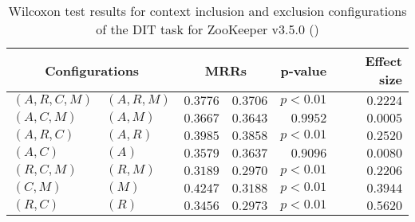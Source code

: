 
\begin{table}
\begin{spacing}{1.2}
\centering
\caption{Wilcoxon test results for context inclusion and exclusion configurations of the DIT task for ZooKeeper v3.5.0 (\ctwo)}
\label{table:versus-wilcox-zookeeper-dit-context}
\begin{tabular}{ll|rr|rr}
\toprule
      \multicolumn{2}{c|}{Configurations} &                \multicolumn{2}{c|}{MRRs} &             p-value & Effect size \\
\midrule
 $(A,R,C,M)$ &  $(A,R,M)$ &  $\bm{0.3776}$ &       $0.3706$ & $p<0.01$ &    $0.2224$ \\
   $(A,C,M)$ &    $(A,M)$ &  $\bm{0.3667}$ &       $0.3643$ & $0.9952$ &    $0.0005$ \\
   $(A,R,C)$ &    $(A,R)$ &  $\bm{0.3985}$ &       $0.3858$ & $p<0.01$ &    $0.2520$ \\
     $(A,C)$ &      $(A)$ &       $0.3579$ &  $\bm{0.3637}$ & $0.9096$ &    $0.0080$ \\
   $(R,C,M)$ &    $(R,M)$ &  $\bm{0.3189}$ &       $0.2970$ & $p<0.01$ &    $0.2206$ \\
     $(C,M)$ &      $(M)$ &  $\bm{0.4247}$ &       $0.3188$ & $p<0.01$ &    $0.3944$ \\
     $(R,C)$ &      $(R)$ &  $\bm{0.3456}$ &       $0.2973$ & $p<0.01$ &    $0.5620$ \\
\bottomrule
\end{tabular}

\end{spacing}
\end{table}

